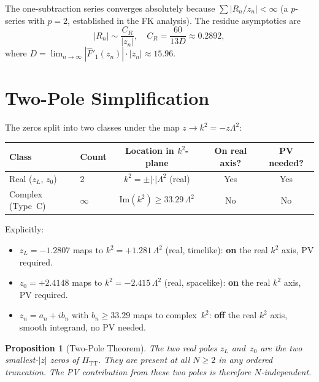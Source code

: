 \documentclass[11pt,a4paper]{article}
\newcommand{\PiTT}{\Pi_{\mathrm{TT}}}
\newcommand{\Fhat}{\hat{F}}
\newcommand{\Imag}{\mathrm{Im}}
\newtheorem{proposition}[theorem]{Proposition}
\begin{document}
The one-subtraction series converges absolutely because
$\sum |R_n/z_n| < \infty$ (a $p$-series with $p = 2$, established in
the FK analysis).  The residue asymptotics are
\begin{equation}\label{eq:decay}
  |R_n| \sim \frac{C_R}{|z_n|}, \quad
  C_R = \frac{60}{13D} \approx 0.2892,
\end{equation}
where $D = \lim_{n\to\infty} |\Fhat'_1(z_n)|\cdot|z_n| \approx 15.96$.


\section{Two-Pole Simplification}
\label{sec:two-pole}

The zeros split into two classes under the map $z \to k^2 = -z\Lambda^2$:

\begin{center}
\begin{tabular}{llccc}
\toprule
Class & Count & Location in $k^2$-plane & On real axis? & PV needed? \\
\midrule
Real ($z_L$, $z_0$) & 2 & $k^2 = \pm|\cdot|\Lambda^2$ (real) & Yes & Yes \\
Complex (Type~C) & $\infty$ & $\Imag(k^2) \geq 33.29\,\Lambda^2$ & No & No \\
\bottomrule
\end{tabular}
\end{center}

\noindent
Explicitly:
\begin{itemize}[nosep]
  \item $z_L = -1.2807$ maps to $k^2 = +1.281\,\Lambda^2$ (real, timelike):
    \textbf{on} the real $k^2$ axis, PV required.
  \item $z_0 = +2.4148$ maps to $k^2 = -2.415\,\Lambda^2$ (real, spacelike):
    \textbf{on} the real $k^2$ axis, PV required.
  \item $z_n = a_n + i b_n$ with $b_n \geq 33.29$ maps to complex~$k^2$:
    \textbf{off} the real $k^2$ axis, smooth integrand, no PV needed.
\end{itemize}

\begin{proposition}[Two-Pole Theorem]
\label{prop:twopole}
The two real poles $z_L$ and~$z_0$ are the two smallest-$|z|$ zeros of
$\PiTT$.  They are present at all $N \geq 2$ in any ordered truncation.
The PV contribution from these two poles is therefore $N$-independent.
\end{proposition}
\end{document}
